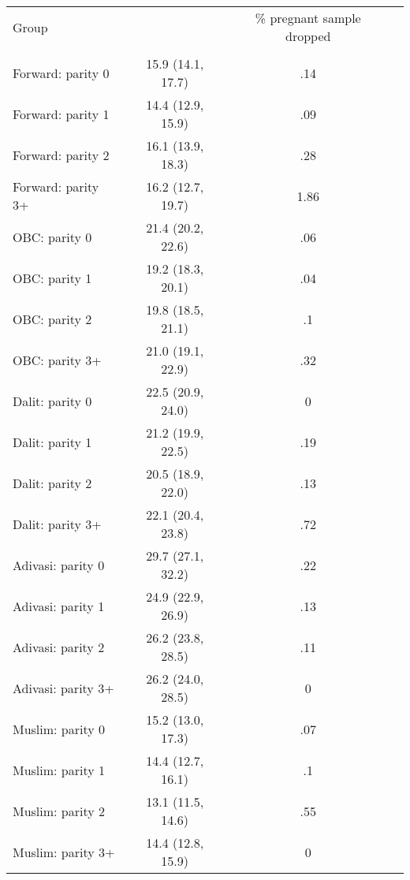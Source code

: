 \begin{tabular}{lccc}
\toprule
Group &  & \% pregnant sample dropped \\\\
\midrule
Forward: parity 0&15.9 (14.1, 17.7)&.14\\
Forward: parity 1&14.4 (12.9, 15.9)&.09\\
Forward: parity 2&16.1 (13.9, 18.3)&.28\\
Forward: parity 3+&16.2 (12.7, 19.7)&1.86\\
OBC: parity 0&21.4 (20.2, 22.6)&.06\\
OBC: parity 1&19.2 (18.3, 20.1)&.04\\
OBC: parity 2&19.8 (18.5, 21.1)&.1\\
OBC: parity 3+&21.0 (19.1, 22.9)&.32\\
Dalit: parity 0&22.5 (20.9, 24.0)&0\\
Dalit: parity 1&21.2 (19.9, 22.5)&.19\\
Dalit: parity 2&20.5 (18.9, 22.0)&.13\\
Dalit: parity 3+&22.1 (20.4, 23.8)&.72\\
Adivasi: parity 0&29.7 (27.1, 32.2)&.22\\
Adivasi: parity 1&24.9 (22.9, 26.9)&.13\\
Adivasi: parity 2&26.2 (23.8, 28.5)&.11\\
Adivasi: parity 3+&26.2 (24.0, 28.5)&0\\
Muslim: parity 0&15.2 (13.0, 17.3)&.07\\
Muslim: parity 1&14.4 (12.7, 16.1)&.1\\
Muslim: parity 2&13.1 (11.5, 14.6)&.55\\
Muslim: parity 3+&14.4 (12.8, 15.9)&0\\
\bottomrule
\end{tabular}
